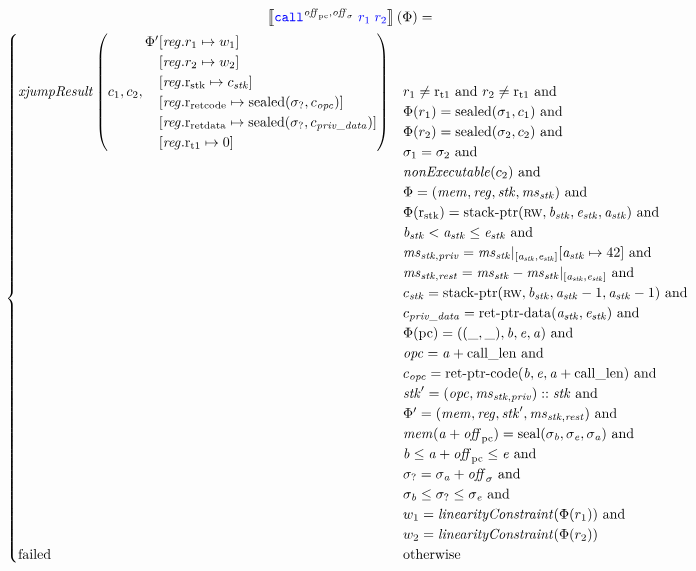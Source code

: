 \documentclass[a4paper]{article}
\begin{document}
\begin{multline*}
  \sem{\scall{\offpc,\offsigma}{\src{r_1}}{\src{r_2}}}(\Phi) = \\
  \begin{cases}
    \mathit{xjumpResult}\left(c_1,c_2, 
     \arraycolsep=0pt
    \array[]{rl}
      \Phi'&\updReg{r_1}{w_1} \\
      &\updReg{r_2}{w_2} \\
      &\updReg{\rstk}{c_\stk}\\
      &\updReg{\rretc}{\sealed{\sigma_?,c_\opc}}\\
      &\updReg{\rretd}{\sealed{\sigma_?,c_\var{priv\_data}}}\\
      &\updReg{\rtmp{1}}{0}
      \endarray
     \right)
    & \arraycolsep=0pt
    \begin{array}[t]{l}
      r_1 \neq \rtmp{1} \tand r_2 \neq \rtmp{1} \tand\\
      \Phi(r_1) = \sealed{\sigma_1,c_1} \tand \\
      \Phi(r_2) = \sealed{\sigma_2,c_2} \tand \\
      \sigma_1 = \sigma_2 \tand \\
      \nonExec{c_2} \tand\\
      \Phi = (\mem,\reg,\stk,\ms_\stk) \tand\\
      \Phi(\rstk) = \stkptr{\rw,\baddr_\stk,\eaddr_\stk,\aaddr_\stk} \tand \\
      \baddr_\stk < \aaddr_\stk \leq \eaddr_\stk \tand \\
      \ms_{\stk,\priv} = \ms_\stk |_{[\aaddr_\stk,\eaddr_\stk]}\update{\aaddr_\stk}{42} \tand\\
      \ms_{\stk,\var{rest}} = \ms_\stk - \ms_\stk |_{[\aaddr_\stk,\eaddr_\stk]} \tand \\
      c_\stk = \stkptr{\rw,\baddr_\stk,\aaddr_\stk-1,\aaddr_\stk-1} \tand \\
      c_\var{priv\_data} = \retptrd(\aaddr_\stk,\eaddr_\stk) \tand \\
      \Phi(\pcreg) = ((\_,\_),\baddr,\eaddr,\aaddr) \tand \\
      \opc = \aaddr + \calllen \tand \\
      c_\opc = \retptrc(\baddr,\eaddr,\aaddr+\calllen) \tand \\
      \stk' = (\opc,\ms_{\stk,\priv}) :: \stk \tand\\
      \Phi' = (\mem,\reg,\stk',\ms_{\stk,\var{rest}})\tand\\
      \mem(\aaddr+\offpc) = \seal{\sigma_\baddr,\sigma_\eaddr,\sigma_\aaddr}\tand\\
      \baddr \leq  \aaddr+\offpc \leq \eaddr \tand \\
      \sigma_? = \sigma_\aaddr + \offsigma \tand\\
      \sigma_\baddr \leq \sigma_? \leq \sigma_\eaddr \tand\\
      w_1 = \linCons{\Phi(r_1)} \tand \\
      w_2 = \linCons{\Phi(r_2)}
    \end{array}\\
    \failed & \totherwise
  \end{cases}
\end{multline*}
\end{document}
